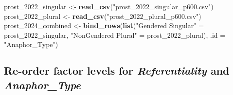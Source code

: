 \documentclass[
  10pt,
]{article}
\newenvironment{Shaded}{\begin{snugshade}}{\end{snugshade}}
\newcommand{\AttributeTok}[1]{\textcolor[rgb]{0.13,0.29,0.53}{#1}}
\newcommand{\FunctionTok}[1]{\textcolor[rgb]{0.13,0.29,0.53}{\textbf{#1}}}
\newcommand{\NormalTok}[1]{#1}
\newcommand{\OtherTok}[1]{\textcolor[rgb]{0.56,0.35,0.01}{#1}}
\newcommand{\SpecialCharTok}[1]{\textcolor[rgb]{0.81,0.36,0.00}{\textbf{#1}}}
\newcommand{\StringTok}[1]{\textcolor[rgb]{0.31,0.60,0.02}{#1}}
\begin{document}
\begin{Shaded}
\begin{Highlighting}[]
\NormalTok{prost\_2022\_singular }\OtherTok{\textless{}{-}} \FunctionTok{read\_csv}\NormalTok{(}\StringTok{"prost\_2022\_singular\_p600.csv"}\NormalTok{)}
\NormalTok{prost\_2022\_plural }\OtherTok{\textless{}{-}} \FunctionTok{read\_csv}\NormalTok{(}\StringTok{"prost\_2022\_plural\_p600.csv"}\NormalTok{)}
\NormalTok{prost\_2024\_combined }\OtherTok{\textless{}{-}} \FunctionTok{bind\_rows}\NormalTok{(}\FunctionTok{list}\NormalTok{(}\StringTok{"Gendered Singular"} \OtherTok{=}\NormalTok{ prost\_2022\_singular, }
                                     \StringTok{"NonGendered Plural"} \OtherTok{=}\NormalTok{ prost\_2022\_plural), }\AttributeTok{.id =} \StringTok{"Anaphor\_Type"}\NormalTok{)}
\end{Highlighting}
\end{Shaded}

\subsection{\texorpdfstring{Re-order factor levels for
\emph{Referentiality} and
\emph{Anaphor\_Type}}{Re-order factor levels for Referentiality and Anaphor\_Type}}\label{re-order-factor-levels-for-referentiality-and-anaphor_type}

\begin{Shaded}
\end{Shaded}
\end{document}
